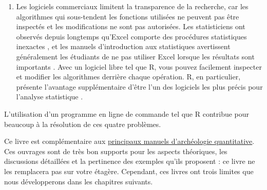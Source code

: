 \documentclass[
  french,
]{scrbook}
\begin{document}
\begin{enumerate}
  Les logiciels commerciaux (et même certains logiciels libres) rendent difficile la démonstration et la reproductibilité en raison de la nature éphémère des interfaces graphiques. Ces interfaces sont familières et faciles à utiliser pour la plupart des gens, car elles sont associées au développement de l'informatique domestique. Il est cependant très difficile d'enregistrer efficacement une séquence de clics complexes afin qu'une autre personne (ou vous-même à l'avenir) puisse répéter la procédure sans ambiguïté. Il est donc difficile de rendre vos analyses reproductibles si tout votre travail est effectué avec une souris. Il n'est pas pratique d'abandonner complètement l'utilisation de la souris lorsqu'on utilise un ordinateur, mais en utilisant un programme en ligne de commande tel que R, il devient possible d'enregistrer en texte brut les étapes les plus importantes de l'analyse. Nous disposons alors d'un enregistrement détaillé des étapes de notre analyse : nous pouvons facilement la partager avec d'autres et la réutiliser nous-mêmes, des mois ou des années plus tard.
\item
  Les logiciels commerciaux limitent la transparence de la recherche, car les algorithmes qui sous-tendent les fonctions utilisées ne peuvent pas être inspectés et les modifications ne sont pas autorisées. Les statisticiens ont observés depuis longtemps qu'Excel comporte des procédures statistiques inexactes \autocite{mccullough2008,yalta2008}, et les manuels d'introduction aux statistiques avertissent généralement les étudiants de ne pas utiliser Excel lorsque les résultats sont importants \autocite[voir par exemple][]{keller2000}. Avec un logiciel libre tel que R, vous pouvez facilement inspecter et modifier les algorithmes derrière chaque opération. R, en particulier, présente l'avantage supplémentaire d'être l'un des logiciels les plus précis pour l'analyse statistique \autocite{almiron2009,keeling2007}.
\end{enumerate}

L'utilisation d'un programme en ligne de commande tel que R contribue pour beaucoup à la résolution de ces quatre problèmes.

Ce livre est complémentaire aux \protect\hyperlink{ressources-compluxe9mentaires}{principaux manuels d'archéologie quantitative}. Ces ouvrages sont de très bon supports pour les aspects théoriques, les discussions détaillées et la pertinence des exemples qu'ils proposent : ce livre ne les remplacera pas sur votre étagère. Cependant, ces livres ont trois limites que nous développerons dans les chapitres suivants.
\end{document}
